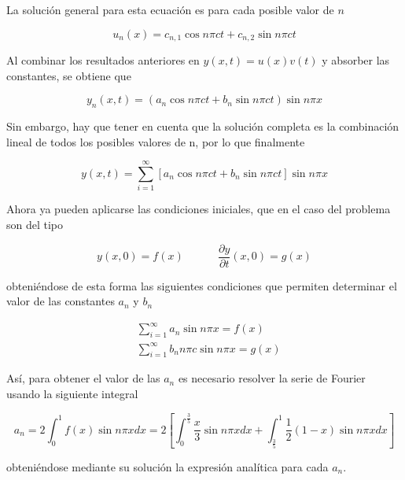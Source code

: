 \documentclass[11pt]{article}
\begin{document}
La solución general para esta ecuación es para cada posible valor de $n$

\begin{equation}
	u_n(x) = c_{n,1}\cos{n\pi{c}t} + c_{n,2}\sin{n\pi{c}t}
\end{equation}

Al combinar los resultados anteriores en $y(x,t) = u(x)v(t)$ y absorber las constantes, se
obtiene que

\begin{equation}
	y_n(x,t) = (a_n\cos{n\pi{c}t} + b_n\sin{n\pi{c}t})\sin{n\pi{x}}
\end{equation}

Sin embargo, hay que tener en cuenta que la solución completa es la combinación lineal de
todos los posibles valores de n, por lo que finalmente

\begin{equation}
	y(x,t) = \sum\limits_{i=1}^\infty[a_n\cos{n\pi{c}t} + b_n\sin{n\pi{c}t}]\sin{n\pi{x}}
\label{eq:sol_analitica}
\end{equation}

Ahora ya pueden aplicarse las condiciones iniciales, que en el caso del problema son del
tipo

\begin{equation}
	y(x, 0) = f(x)~~~~~~~~~~~~~~\frac{\partial{y}}{\partial{t}}(x, 0) = g(x)
\end{equation}

obteniéndose de esta forma las siguientes condiciones que permiten determinar el valor de
las constantes $a_n$ y $b_n$

\begin{subequations}
\begin{flalign}
	&\sum\limits_{i=1}^\infty a_n \sin{n\pi{x}} = f(x)\\
	&\sum\limits_{i=1}^\infty b_n n\pi{c} \sin{n\pi{x}} = g(x)
\end{flalign}
\end{subequations}

Así, para obtener el valor de las $a_n$ es necesario resolver la serie de Fourier usando
la siguiente integral

\begin{equation}
	a_n = 2 \int_0^1 f(x) \sin{n\pi{x}}dx = 2[\int_0^\frac{3}{5} \frac{x}{3} \sin{n\pi{x}}dx
	+ \int_{\frac{3}{5}}^1 \frac{1}{2}(1-x) \sin{n\pi{x}}dx]
\end{equation}

obteniéndose mediante su solución la expresión analítica para cada $a_n$.
\end{document}
